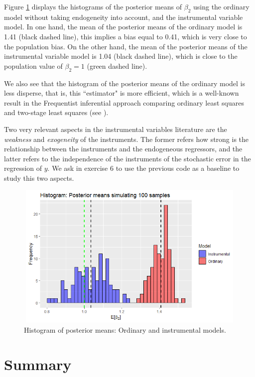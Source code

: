 Figure \ref{fig71} displays the histograms of the posterior means of $\beta_2$ using the ordinary model without taking endogeneity into account, and the instrumental variable model. In one hand, the mean of the posterior means of the ordinary model is 1.41 (black dashed line), this implies a bias equal to 0.41, which is very close to the population bias. On the other hand, the mean of the posterior means of the instrumental variable model is 1.04 (black dashed line), which is close to the population value of $\beta_2=1$ (green dashed line).

We also see that the histogram of the posterior means of the ordinary model is less disperse, that is, this ``estimator" is more efficient, which is a well-known result in the Frequentist inferential approach comparing ordinary least squares and two-stage least squares (see \cite[Chap. ~5]{wooldridge2010econometric}).

Two very relevant aspects in the instrumental variables literature are the \textit{weakness} and \textit{exogeneity} of the instruments. The former refers how strong is the relationship between the instruments and the endogeneous regressors, and the latter refers to the independence of the instruments of the stochastic error in the regression of $y$. We ask in exercise 6 to use the previous code as a baseline to study this two aspects.
 
\begin{figure}
	\includegraphics[width=340pt, height=200pt]{Chapters/chapter7/figures/Fig71.png}
	\caption[List of figure caption goes here]{Histogram of posterior means: Ordinary and instrumental models.}\label{fig71}
\end{figure}

\section{Summary}\label{sec75}

